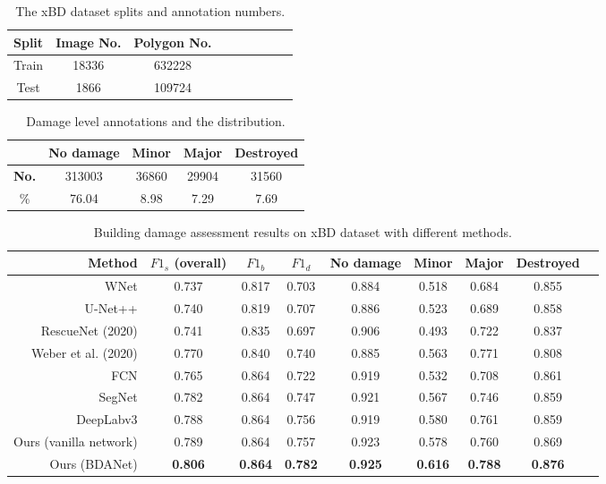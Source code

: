 \documentclass[journal]{IEEEtran}
\begin{document}
\begin{table}[tp]
	\centering
	\caption{The xBD dataset splits and annotation numbers. }
	\setlength{\tabcolsep}{2.6mm} {
		\begin{tabular}{c|cccccccc}
			\hline \hline
    {Split}     & {Image No.}     & {Polygon No.} \\
    \hline
    Train & 18336  &  632228     \\
    Test    & 1866  & 109724     \\
\hline	\hline	
	\end{tabular}}
	\label{tabDatasplit}
\end{table}

\begin{table}[tp]
	\centering
	\caption{Damage level annotations and the distribution.}
	\setlength{\tabcolsep}{2.6mm} {
		\begin{tabular}{c|cccc}
			\hline \hline
       & No damage    & Minor & Major & Destroyed \\
    \hline
   \textbf{No.} & 313003  &  36860    & 29904 & 31560 \\
   \%  &     76.04     & 8.98 & 7.29 &7.69              \\
\hline	\hline	
	\end{tabular}}
	\label{tabLevelDis}
\end{table}


\begin{table*}[!t]
	\centering
	\caption{Building damage assessment results on xBD dataset with different methods. }
	\setlength{\tabcolsep}{2.6mm} {
		\begin{tabular}{r|cccccccc}
			\hline \hline
	Method & $F1_s$ (overall) & $F1_b$ & $F1_d$  & No damage    & Minor & Major & Destroyed \\
	\hline
	WNet \cite{houWNetCDGANBitemporal2020} & 0.737&	0.817&	0.703	&0.884	&0.518&	0.684&	0.855 \\
	U-Net++ \cite{pengEndtoEndChangeDetection2019} & 0.740&	0.819	&0.707&	0.886&	0.523&	0.689&	0.858\\
       \hline
    RescueNet \cite{gupta2020rescuenet} (2020) & 0.741 & 0.835 &	0.697 &	0.906 &	0.493 &	0.722 &	0.837 \\
   Weber et al. \cite{weber2020building} (2020)  & 0.770 &	0.840 &	0.740 &	0.885 &	0.563 &	0.771 &	0.808   \\
   \hline
   FCN \cite{Long_2015_CVPR} & 0.765&	0.864&	0.722&	0.919&	0.532&	0.708&	0.861 \\
   SegNet \cite{badrinarayananSegNetDeepConvolutional2017} & 0.782&	0.864&	0.747&	0.921&	0.567&	0.746&	0.859
\\
   DeepLabv3 \cite{chen2017rethinking} &0.788&	0.864&	0.756&	0.919&	0.580&	0.761&	0.859
 \\
   Ours (vanilla network) & 0.789 & 0.864 &	0.757 &	0.923 &	0.578 &	0.760 &	0.869  \\
   Ours (BDANet) &  \textbf{0.806} &	\textbf{0.864} & \textbf{0.782} &	\textbf{0.925} &	\textbf{0.616} &	\textbf{0.788} &	\textbf{0.876}   \\
\hline	\hline	
	\end{tabular}}
	\label{tabResults}
\end{table*}
\end{document}
